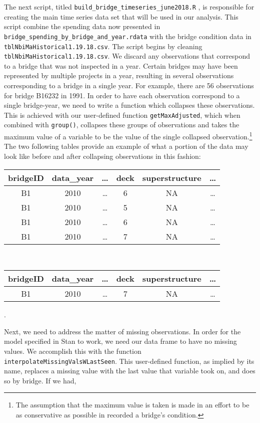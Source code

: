 \documentclass{article}
\begin{document}
The next script, titled \texttt{build\_bridge\_timeseries\_june2018.R}  , is responsible for creating the main time series data set that will be used in our analysis. This script combine the spending data now presented in \texttt{bridge\_spending\_by\_bridge\_and\_year.rdata} with the bridge condition data in \texttt{tblNbiMaHistorical1.19.18.csv}. The script begins by cleaning \texttt{tblNbiMaHistorical1.19.18.csv}. We discard any observations that correspond to a bridge that was not inspected in a year. Certain bridges may have been represented by multiple projects in a year, resulting in several observations corresponding to a bridge in a single year. For example, there are 56 observations for bridge B16232 in 1991. In order to have each observation correspond to a single bridge-year, we need to write a function which collapses these observations. This is achieved with our user-defined function \texttt{getMaxAdjusted}, which when combined with \texttt{group()}, collapses these groups of observations and takes the maximum value of a variable to be the value of the single collapsed observation.\footnote{The assumption that the maximum value is taken is made in an effort to be as conservative as possible in recorded a bridge's condition.} The two following tables provide an example of what a portion of the data may look like before and after collapsing observations in this fashion:
\begin{center}
\begin{tabular}{cccccc}
	bridgeID & data\_year &\ldots & deck & superstructure &\ldots\\ \hline   
	B1 & 2010 &\ldots & 6 & NA &\ldots\\
	B1 & 2010 &\ldots & 5 & NA &\ldots\\  
	B1 & 2010 &\ldots & 6 & NA &\ldots\\  
	B1 & 2010 &\ldots & 7 & NA &\ldots\\  
\end{tabular}\\
\begin{tabular}{cccccc}
	bridgeID & data\_year &\ldots & deck & superstructure &\ldots\\ \hline   
B1 & 2010 &\ldots & 7 & NA &\ldots\\
\end{tabular}.
\end{center}
Next, we need to address the matter of missing observations. In order for the model specified in Stan to work, we need our data frame to have no missing values. We accomplish this with the function \texttt{interpolateMissingValsWLastSeen}. This user-defined function, as implied by its name, replaces a missing value with the last value that variable took on, and does so by bridge. If we had, 
\end{document}
